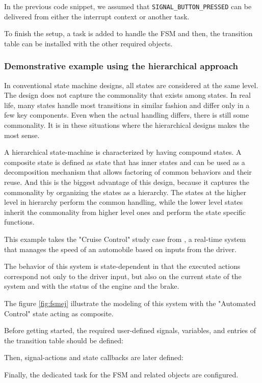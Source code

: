 

In the previous code snippet, we assumed that \lstinline{SIGNAL_BUTTON_PRESSED} can be delivered from either the interrupt context or another task.

To finish the setup, a task is added to handle the FSM and then, the transition table can be installed with the other required objects.
\medskip



\subsubsection{Demonstrative example using the hierarchical approach} 
In conventional state machine designs, all states are considered at the same level. The design does not capture the commonality that exists among states. In real life, many states handle most transitions in similar fashion and differ only in a few key components. Even when the actual handling differs, there is still some commonality. It is in these situations where the hierarchical designs makes the most sense.

A hierarchical state-machine is characterized by having compound states. A composite state is defined as state that has inner states and can be used as a decomposition mechanism that allows factoring of common behaviors and their reuse. And this is the biggest advantage of this design, because it captures the commonality by organizing the states as a hierarchy. The states at the higher level in hierarchy perform the common handling, while the lower level states inherit the commonality from higher level ones and perform the state specific functions.

This example takes the "Cruise Control" study case from \cite{gomaa}, a real-time system that manages the speed of an automobile based on inputs from the driver. 

The behavior of this system is state-dependent in that the executed actions correspond not only to the driver input, but also on the current state of the system and with the status of the engine and the brake. 

The figure \ref{fig:fsmej} illustrate the modeling of this system with the "Automated Control" state acting as composite.
\medskip



Before getting started, the required user-defined signals, variables, and entries of the transition table should be defined:
\medskip



Then, signal-actions and state callbacks are later defined:
\medskip



Finally, the dedicated task for the FSM and related objects are configured.
\medskip
